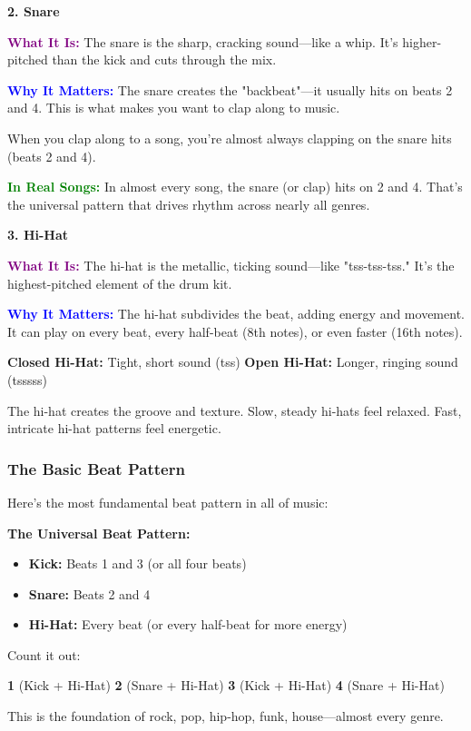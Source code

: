 \documentclass[11pt,letterpaper]{article}
\newcommand{\purple}[1]{\textcolor{purple}{\textbf{#1}}}
\newcommand{\bluepurple}[1]{\textcolor{blue}{\textbf{#1}}}
\newcommand{\greentext}[1]{\textcolor{green}{\textbf{#1}}}
\begin{document}
\vspace{0.3cm}

\textbf{2. Snare}

\textbf{\purple{What It Is:}} The snare is the sharp, cracking sound—like a whip. It's higher-pitched than the kick and cuts through the mix.

\textbf{\bluepurple{Why It Matters:}} The snare creates the "backbeat"—it usually hits on beats 2 and 4. This is what makes you want to clap along to music.

When you clap along to a song, you're almost always clapping on the snare hits (beats 2 and 4).

\textbf{\greentext{In Real Songs:}} In almost every song, the snare (or clap) hits on 2 and 4. That's the universal pattern that drives rhythm across nearly all genres.

\vspace{0.3cm}

\textbf{3. Hi-Hat}

\textbf{\purple{What It Is:}} The hi-hat is the metallic, ticking sound—like "tss-tss-tss." It's the highest-pitched element of the drum kit.

\textbf{\bluepurple{Why It Matters:}} The hi-hat subdivides the beat, adding energy and movement. It can play on every beat, every half-beat (8th notes), or even faster (16th notes).

\textbf{Closed Hi-Hat:} Tight, short sound (tss)
\textbf{Open Hi-Hat:} Longer, ringing sound (tsssss)

The hi-hat creates the groove and texture. Slow, steady hi-hats feel relaxed. Fast, intricate hi-hat patterns feel energetic.

\subsubsection{The Basic Beat Pattern}

Here's the most fundamental beat pattern in all of music:

\begin{tcolorbox}[colback=red!5,colframe=red,width=\textwidth,arc=3mm,boxrule=1pt]
\textbf{The Universal Beat Pattern:}

\begin{itemize}[leftmargin=*]
\item \textbf{Kick:} Beats 1 and 3 (or all four beats)
\item \textbf{Snare:} Beats 2 and 4
\item \textbf{Hi-Hat:} Every beat (or every half-beat for more energy)
\end{itemize}

\vspace{0.3cm}

Count it out:

\begin{center}
\textbf{1} (Kick + Hi-Hat) \quad \textbf{2} (Snare + Hi-Hat) \quad \textbf{3} (Kick + Hi-Hat) \quad \textbf{4} (Snare + Hi-Hat)
\end{center}

This is the foundation of rock, pop, hip-hop, funk, house—almost every genre.
\end{tcolorbox}
\end{document}
